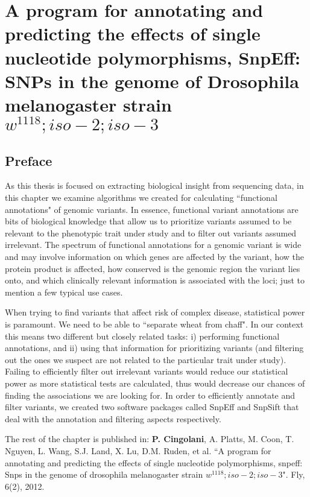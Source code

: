 
\chapter{A program for annotating and predicting the
effects of single nucleotide polymorphisms,
SnpEff: SNPs in the genome of Drosophila
melanogaster strain $w^{1118} ; iso-2; iso-3$\label{ch:snpeff}}

\section{Preface}

As this thesis is focused on extracting biological insight from sequencing data, in this chapter we examine algorithms we created for calculating ``functional annotations" of genomic variants. 
In essence, functional variant annotations are bits of biological knowledge that allow us to prioritize variants assumed to be relevant to the phenotypic trait under study and to filter out variants assumed irrelevant. The spectrum of functional annotations for a genomic variant is wide and may involve information on which genes are affected by the variant, how the protein product is affected, how conserved is the genomic region the variant lies onto, and which clinically relevant information is associated with the loci; just to mention a few typical use cases.

When trying to find variants that affect risk of complex disease, statistical power is paramount. We need to be able to ``separate wheat from chaff". In our context this means two different but closely related tasks: i) performing functional annotations, and ii) using that information for prioritizing variants (and filtering out the ones we suspect are not related to the particular trait under study). Failing to efficiently filter out irrelevant variants would reduce our statistical power as more statistical tests are calculated, thus would decrease our chances of finding the associations we are looking for. In order to efficiently annotate and filter variants, we created two software packages called SnpEff and SnpSift that deal with the annotation and filtering aspects respectively.

The rest of the chapter is published in: \textbf{P. Cingolani}, A. Platts, M. Coon, T. Nguyen, L. Wang, S.J. Land, X. Lu, D.M. Ruden, et al. ``A program for annotating and predicting the effects of single nucleotide polymorphisms, snpeff: Snps in the genome of drosophila melanogaster strain $w^{1118}; iso-2; iso-3$". Fly, 6(2), 2012.

